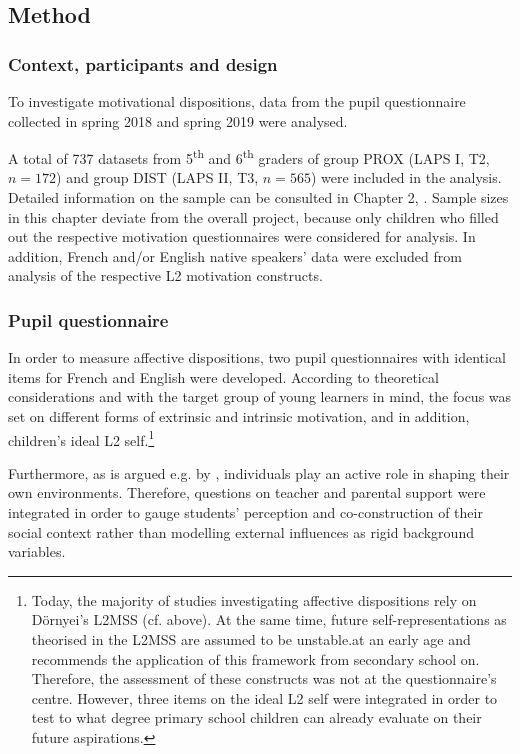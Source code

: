 \documentclass[output=paper]{langsci/langscibook}
\begin{document}
 \subsection{Method}
 \subsubsection{Context, participants and design}

To investigate motivational dispositions, data from the pupil questionnaire collected in spring 2018 and spring 2019 were analysed. 

A total of 737 datasets from 5\textsuperscript{th} and 6\textsuperscript{th} graders of group PROX (LAPS I, T2, $n=172$) and group DIST (LAPS II, T3, $n=565$) were included in the analysis. Detailed information on the sample can be consulted in Chapter 2, . Sample sizes in this chapter deviate from the overall project, because only children who filled out the respective motivation questionnaires were considered for analysis. In addition, French and/or English native speakers’ data were excluded from analysis of the respective L2 motivation constructs.


\subsubsection{Pupil questionnaire}


In order to measure affective dispositions, two pupil questionnaires with identical items for French and English were developed. According to theoretical considerations and with the target group of young learners in mind, the focus was set on different forms of extrinsic and intrinsic motivation, and in addition, children’s ideal L2 self.\footnote{Today, the majority of studies investigating affective dispositions rely on Dörnyei’s L2MSS (cf.  above). At the same time, future self-representations as theorised in the L2MSS are assumed to be unstable.at an early age and \citet{Doernyei2009} recommends the application of this framework from secondary school on. Therefore, the assessment of these constructs was not at the questionnaire’s centre. However, three items on the ideal L2 self were integrated in order to test to what degree primary school children can already evaluate on their future aspirations.} 

Furthermore, as is argued e.g. by \citet{Ushioda2009}, individuals play an active role in shaping their own environments. Therefore, questions on teacher and parental support were integrated in order to gauge students’ perception and co-construction of their social context rather than modelling external influences as rigid background variables.
\end{document}
